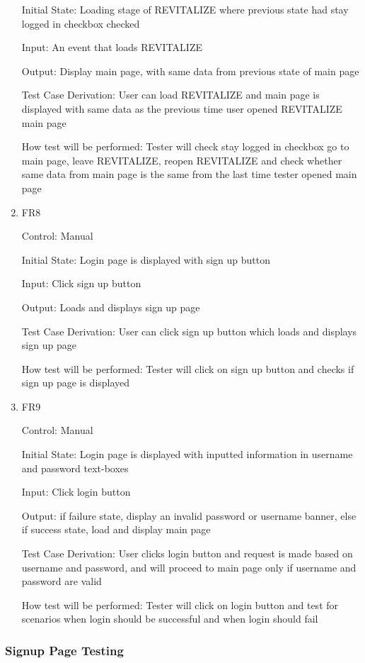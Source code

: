 \documentclass[12pt, titlepage]{article}
\begin{document}
\begin{enumerate}
Initial State: Loading stage of REVITALIZE where previous state had stay logged in checkbox checked
					
Input: An event that loads REVITALIZE
					
Output: Display main page, with same data from previous state of main page

Test Case Derivation: User can load REVITALIZE and main page is displayed with same data as the previous time user opened REVITALIZE main page

How test will be performed: Tester will check stay logged in checkbox go to main page, leave REVITALIZE, reopen REVITALIZE and check whether same data from main page is the same from the last time tester opened main page

\item{FR8\\}

Control: Manual
					
Initial State: Login page is displayed with sign up button
					
Input: Click sign up button
					
Output: Loads and displays sign up page

Test Case Derivation: User can click sign up button which loads and displays sign up page

How test will be performed: Tester will click on sign up button and checks if sign up page is displayed

\item{FR9\\}

Control: Manual
					
Initial State: Login page is displayed with inputted information in username and password text-boxes
					
Input: Click login button
					
Output: if failure state, display an invalid password or username banner, else if success state, load and display main page

Test Case Derivation: User clicks login button and request is made based on username and password, and will proceed to main page only if username and password are valid

How test will be performed: Tester will click on login button and test for scenarios when login should be successful and when login should fail


\end{enumerate}

\subsubsection{Signup Page Testing}
\end{document}
